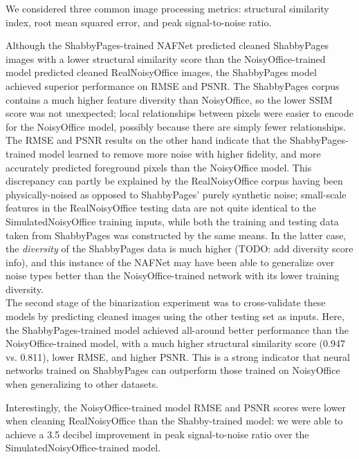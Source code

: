 \documentclass[runningheads]{llncs}
\begin{document}
We considered three common image processing metrics: structural similarity index, root mean squared error, and peak signal-to-noise ratio.

Although the ShabbyPages-trained NAFNet predicted cleaned ShabbyPages images with a lower structural similarity score than the NoisyOffice-trained model predicted cleaned RealNoisyOffice images, the ShabbyPages model achieved superior performance on RMSE and PSNR. The ShabbyPages corpus contains a much higher feature diversity than NoisyOffice, so the lower SSIM score was not unexpected; local relationships between pixels were easier to encode for the NoisyOffice model, possibly because there are simply fewer relationships. The RMSE and PSNR results on the other hand indicate that the ShabbyPages-trained model learned to remove more noise with higher fidelity, and more accurately predicted foreground pixels than the NoisyOffice model. This discrepancy can partly be explained by the RealNoisyOffice corpus having been physically-noised as opposed to ShabbyPages' purely synthetic noise; small-scale features in the RealNoisyOffice testing data are not quite identical to the SimulatedNoisyOffice training inputs, while both the training and testing data taken from ShabbyPages was constructed by the same means. In the latter case, the \textit{diversity} of the ShabbyPages data is much higher (TODO: add diversity score info), and this instance of the NAFNet may have been able to generalize over noise types better than the NoisyOffice-trained network with its lower training diversity.\\

The second stage of the binarization experiment was to cross-validate these models by predicting cleaned images using the other testing set as inputs. Here, the ShabbyPages-trained model achieved all-around better performance than the NoisyOffice-trained model, with a much higher structural similarity score (0.947 vs. 0.811), lower RMSE, and higher PSNR. This is a strong indicator that neural networks trained on ShabbyPages can outperform those trained on NoisyOffice when generalizing to other datasets.

Interestingly, the NoisyOffice-trained model RMSE and PSNR scores were lower when cleaning RealNoisyOffice than the Shabby-trained model: we were able to achieve a 3.5 decibel improvement in peak signal-to-noise ratio over the SimulatedNoisyOffice-trained model.
\end{document}
